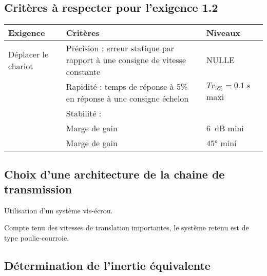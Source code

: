 \begin{multicols}{2}
\subsection*{Critères à respecter pour l'exigence 1.2}
\ifprof
\else
\footnotesize{
\begin{center}
\begin{tabular}{|p{2cm}|p{2.5cm}|p{2cm}|}
\hline
Exigence	& Critères & Niveaux \\ \hline
Déplacer le chariot	& Précision :
erreur statique par rapport à une consigne de vitesse constante	
& NULLE \\ \hline
	& Rapidité : temps de réponse à 5\% en réponse à une consigne échelon 
	& $Tr_{5\%} = \SI{0,1}{s}$  maxi \\ \hline
	& Stabilité : & \\
	& Marge de gain & \SI{6}{dB} mini \\
	&Marge de gain & $\ang{45}$ mini \\
\hline
\end{tabular}
\end{center}}

\fi
\subsection*{Choix d'une architecture de la chaine de transmission}

\ifprof
\begin{corrige}
Utilisation d’un système vis-écrou.
\end{corrige}
\else
\fi

\ifprof
\else
Compte tenu des vitesses de translation importantes, le système retenu est de type poulie-courroie.
\fi

\subsection*{Détermination de l'inertie équivalente} 
\ifprof
\else


\end{multicols}
